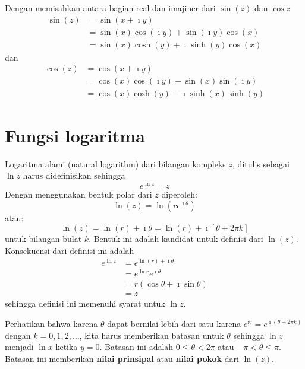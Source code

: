 Dengan memisahkan antara bagian real dan imajiner dari $\sin(z)$ dan
$\cos z$
\begin{align*}
\sin(z) & =\sin\left(x + \imath y\right) \\
 & = \sin(x) \cos(\imath y) + \sin(\imath y) \cos(x) \\
 & = \sin(x) \cosh(y) + \imath \sinh(y)\cos(x)
\end{align*}
dan
\begin{align*}
\cos(z) & = \cos(x + \imath y) \\
 & = \cos(x)\cos(\imath y) - \sin(x) \sin(\imath y) \\
 & = \cos(x)\cosh(y) - \imath \sinh(x) \sinh(y)
\end{align*}



\section{Fungsi logaritma}

Logaritma alami (natural logarithm) dari bilangan kompleks $z$, ditulis
sebagai $\ln z$ harus didefinisikan sehingga
\[
e^{\ln z}=z
\]
Dengan menggunakan bentuk polar dari $z$ diperoleh:
\begin{equation}
\ln(z) = \ln \left(r e^{\imath \theta} \right)
\end{equation}
atau:
\begin{equation}
\ln(z) = \ln(r) + \imath \theta = \ln(r) + \imath\left[\theta + 2\pi k \right]
\label{eq:log-natural}
\end{equation}
untuk bilangan bulat $k$.
Bentuk ini adalah kandidat untuk definisi dari $\ln(z)$. Konsekuensi
dari definisi ini adalah
\begin{align*}
e^{\ln z} & =e^{\ln(r) + \imath \theta}\\
 & = e^{\ln r}e^{\imath \theta}\\
 & = r\left(\cos\theta+\imath \sin\theta\right)\\
 & = z
\end{align*}
sehingga definisi ini memenuhi syarat untuk $\ln z$.

Perhatikan bahwa karena $\theta$ dapat bernilai lebih dari satu karena
$e^{\mathrm{i\theta}} = e^{\imath (\theta + 2\pi k)}$ dengan $k=0,1,2,\ldots$,
kita harus memberikan batasan untuk $\theta$ sehingga $\ln z$
menjadi $\ln x$ ketika $y=0$. Batasan ini adalah $0\leq\theta<2\pi$
atau $-\pi < \theta \leq \pi$. Batasan ini memberikan \textbf{nilai prinsipal}
atau \textbf{nilai pokok} dari $\ln(z)$.


